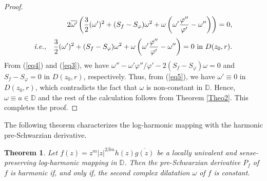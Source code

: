 \documentclass[12pt,reqno]{amsart}
\newtheorem{thm}{Theorem}[section]
\newtheorem{open problem}{Open problem}[section]
\newcommand{\ol}{\overline}
\newcommand{\bea}{\begin{eqnarray}}
\newcommand{\eea}{\end{eqnarray}}
\renewcommand{\phi}{\varphi}
\numberwithin{equation}{section}
\begin{document}
\begin{proof}
\bea &&2\ol{\omega'}\left( \frac{3}{2}(\omega')^2+(S_f- S_\phi)\omega^2+\omega\left(\omega' \frac{\phi''}{\phi'}-\omega''\right)\right)=0,\nonumber\\[1mm]\text{\it i.e.,}
\label{eq5}&& \frac{3}{2}(\omega')^2+(S_f- S_\phi)\omega^2+\omega\left(\omega' \frac{\phi''}{\phi'}-\omega''\right)=0~\text{in}~D(z_0,r).\eea 
From (\ref{eq4}) and (\ref{eq3}), we have $\omega''-\omega' \phi''/\phi'-2(S_f- S_\phi)\omega=0$ and $S_f-S_\phi=0$ in $D(z_0, r)$, respectively. Thus, from (\ref{eq5}), we have $\omega'\equiv 0$ in $D(z_0, r)$, which contradicts the fact that $\omega$ is non-constant in $\mathbb{D}$. Hence, $\omega\equiv a\in\mathbb{D}$ and the
rest of the calculation follows from \textrm{Theorem \ref{Theo2}}. This completes the proof.
\end{proof}
The following theorem characterizes the log-harmonic mapping with the harmonic pre-Schwarzian derivative.
\begin{thm}\label{Theo4}
Let $f(z)=z^m|z|^{2\beta m} h(z)\ol{g(z)}$ be a locally univalent and sense-preserving log-harmonic mapping in $\mathbb{D}$. Then the pre-Schwarzian derivative $P_f$ of $f$ is harmonic if, 
and only if, the second complex dilatation $\omega$ of $f$ is constant.
\end{thm}
\end{document}
